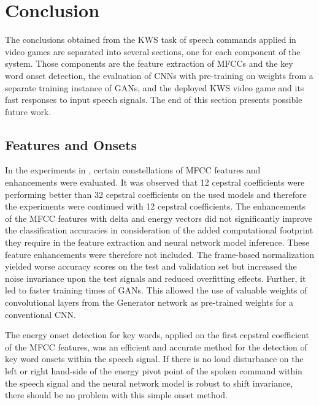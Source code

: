 
\chapter{Conclusion}\label{sec:conclusion}
The conclusions obtained from the KWS task of speech commands applied in video games are separated into several sections, one for each component of the system.
Those components are the feature extraction of MFCCs and the key word onset detection, the evaluation of CNNs with pre-training on weights from a separate training instance of GANs, and the deployed KWS video game and its fast responses to input speech signals.
The end of this section presents possible future work.



\section{Features and Onsets}
In the experiments in , certain constellations of MFCC features and enhancements were evaluated.
It was observed that 12 cepstral coefficients were performing better than 32 cepstral coefficients on the used models and therefore the experiments were continued with 12 cepstral coefficients.
The enhancements of the MFCC features with delta and energy vectors did not significantly improve the classification accuracies in consideration of the added computational footprint they require in the feature extraction and neural network model inference. 
These feature enhancements were therefore not included.
The frame-based normalization yielded worse accuracy scores on the test and validation set but increased the noise invariance upon the test signals and reduced overfitting effects.
Further, it led to faster training times of GANs.
This allowed the use of valuable weights of convolutional layers from the Generator network as pre-trained weights for a conventional CNN.

The energy onset detection for key words, applied on the first cepstral coefficient of the MFCC features, was an efficient and accurate method for the detection of key word onsets within the speech signal.
If there is no loud disturbance on the left or right hand-side of the energy pivot point of the spoken command within the speech signal and the neural network model is robust to shift invariance, there should be no problem with this simple onset method.



